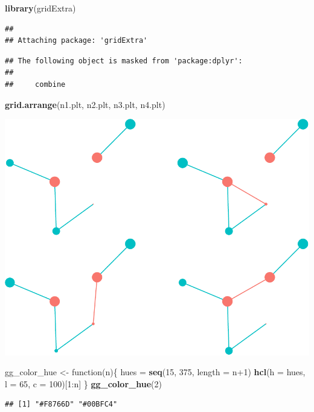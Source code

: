 \documentclass[]{article}
\newenvironment{Shaded}{}{}
\newcommand{\KeywordTok}[1]{\textcolor[rgb]{0.00,0.44,0.13}{\textbf{{#1}}}}
\newcommand{\DataTypeTok}[1]{\textcolor[rgb]{0.56,0.13,0.00}{{#1}}}
\newcommand{\DecValTok}[1]{\textcolor[rgb]{0.25,0.63,0.44}{{#1}}}
\newcommand{\StringTok}[1]{\textcolor[rgb]{0.25,0.44,0.63}{{#1}}}
\newcommand{\NormalTok}[1]{{#1}}
\begin{document}
\begin{Shaded}
\begin{Highlighting}[]
\KeywordTok{library}\NormalTok{(gridExtra)}
\end{Highlighting}
\end{Shaded}

\begin{verbatim}
## 
## Attaching package: 'gridExtra'
\end{verbatim}

\begin{verbatim}
## The following object is masked from 'package:dplyr':
## 
##     combine
\end{verbatim}

\begin{Shaded}
\begin{Highlighting}[]
\KeywordTok{grid.arrange}\NormalTok{(n1.plt, n2.plt, n3.plt, n4.plt)}
\end{Highlighting}
\end{Shaded}

\includegraphics{eq_pop_files/figure-latex/unnamed-chunk-14-1.pdf}

\begin{Shaded}
\begin{Highlighting}[]
\NormalTok{gg_color_hue <-}\StringTok{ }\NormalTok{function(n)\{}
  \NormalTok{hues =}\StringTok{ }\KeywordTok{seq}\NormalTok{(}\DecValTok{15}\NormalTok{, }\DecValTok{375}\NormalTok{, }\DataTypeTok{length =} \NormalTok{n}\DecValTok{+1}\NormalTok{)}
  \KeywordTok{hcl}\NormalTok{(}\DataTypeTok{h =} \NormalTok{hues, }\DataTypeTok{l =} \DecValTok{65}\NormalTok{, }\DataTypeTok{c =} \DecValTok{100}\NormalTok{)[}\DecValTok{1}\NormalTok{:n]}
\NormalTok{\}}
\KeywordTok{gg_color_hue}\NormalTok{(}\DecValTok{2}\NormalTok{)}
\end{Highlighting}
\end{Shaded}

\begin{verbatim}
## [1] "#F8766D" "#00BFC4"
\end{verbatim}
\end{document}
